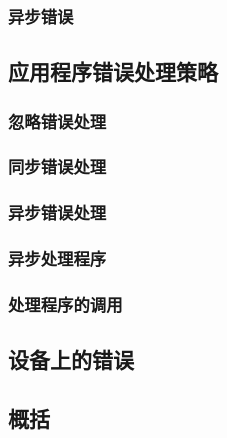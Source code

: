 \subsubsection{异步错误}

\subsection{应用程序错误处理策略}

\subsubsection{忽略错误处理}

\subsubsection{同步错误处理}

\subsubsection{异步错误处理}

\subsubsection{异步处理程序}

\subsubsection{处理程序的调用}

\subsection{设备上的错误}

\subsection{概括}